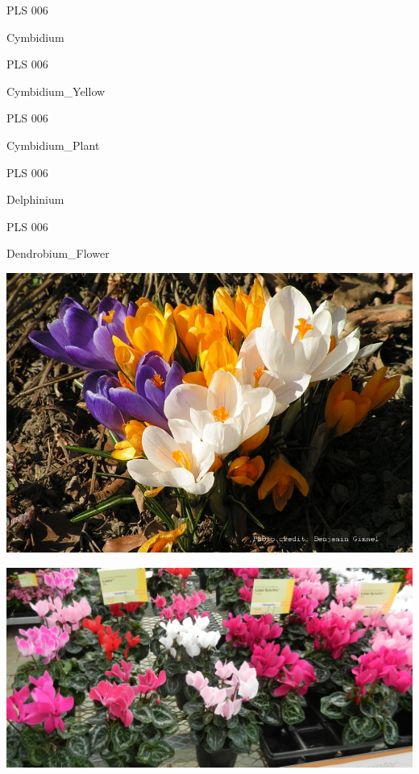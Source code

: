 \documentclass{article}
\begin{document}
\noindent  PLS 006
\vfill
\centerline{{\huge Cymbidium }}
\vfill
\newpage

\noindent  PLS 006
\vfill
\centerline{{\huge Cymbidium\_Yellow }}
\vfill
\newpage

\noindent  PLS 006
\vfill
\centerline{{\huge Cymbidium\_Plant }}
\vfill
\newpage

\noindent  PLS 006
\vfill
\centerline{{\huge Delphinium }}
\vfill
\newpage

\noindent  PLS 006
\vfill
\centerline{{\huge Dendrobium\_Flower }}
\vfill
\newpage

\begin{center}
\includegraphics[height=0.925\paperheight]{../Crocus2.jpg}
\end{center}
\newpage

\begin{center}
\includegraphics[height=0.925\paperheight]{../Cyclamen.jpg}
\end{center}
\newpage
\end{document}
